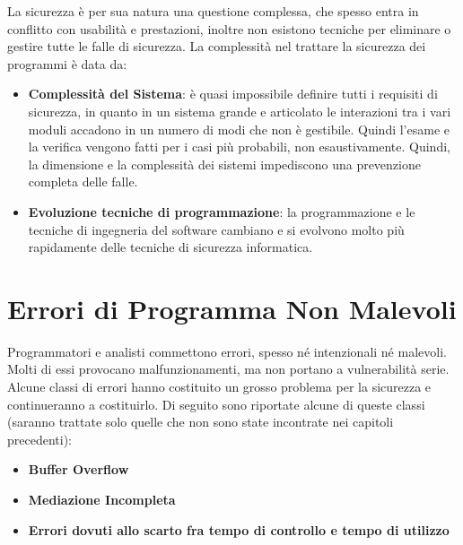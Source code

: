 La sicurezza è per sua natura una questione complessa, che spesso entra in conflitto con usabilità e prestazioni, inoltre non esistono tecniche per eliminare o gestire tutte le falle di sicurezza.
La complessità nel trattare la sicurezza dei programmi è data da:

\begin{itemize}
\item \textbf{Complessità del Sistema}: è quasi impossibile definire tutti i requisiti di sicurezza, in quanto in un sistema grande e articolato le interazioni tra i vari moduli accadono in un numero di modi che non è gestibile. Quindi l'esame e la verifica vengono fatti per i casi più probabili, non esaustivamente. Quindi, la dimensione e la complessità dei sistemi impediscono una prevenzione completa delle falle.
\item \textbf{Evoluzione tecniche di programmazione}: la programmazione e le tecniche di ingegneria del software cambiano e si evolvono molto più rapidamente delle tecniche di sicurezza informatica.
\end{itemize}

\section{Errori di Programma Non Malevoli}
Programmatori e analisti commettono errori, spesso né intenzionali né malevoli. Molti di essi provocano malfunzionamenti, ma non portano a vulnerabilità serie. Alcune classi di errori hanno costituito un grosso problema per la sicurezza e continueranno a costituirlo. 
Di seguito sono riportate alcune di queste classi (saranno trattate solo quelle che non sono state incontrate nei capitoli precedenti):

\begin{itemize}
\item \textbf{Buffer Overflow}
\item \textbf{Mediazione Incompleta}
\item \textbf{Errori dovuti allo scarto fra tempo di controllo e tempo di utilizzo}
\end{itemize}

